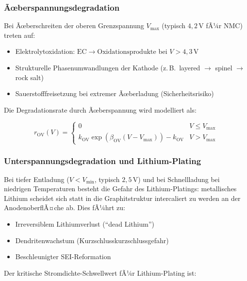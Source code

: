 ﻿\documentclass[12pt,a4paper]{article}
\begin{document}
	\subsubsection{Ãœberspannungsdegradation}
	
	Bei Ãœberschreiten der oberen Grenzspannung $V_\mathrm{max}$ (typisch
	$4{,}2\,\mathrm{V}$ fÃ¼r NMC) treten auf:
	
	\begin{itemize}
		\item Elektrolytoxidation: $\mathrm{EC} \rightarrow \text{Oxidationsprodukte}$ bei
		$V > 4{,}3\,\mathrm{V}$
		\item Strukturelle Phasenumwandlungen der Kathode (z.\,B.\ layered $\to$ spinel $\to$ rock salt)
		\item Sauerstofffreisetzung bei extremer Ãœberladung (Sicherheitsrisiko)
	\end{itemize}
	
	Die Degradationsrate durch Ãœberspannung wird modelliert als:
	
	\begin{equation}
		r_\mathrm{OV}(V) = \begin{cases}
			0 & V \leq V_\mathrm{max} \\
			k_\mathrm{OV} \exp\!\left(\beta_\mathrm{OV}(V - V_\mathrm{max})\right) - k_\mathrm{OV}
			& V > V_\mathrm{max}
		\end{cases}
		\label{eq:overvoltage_rate}
	\end{equation}
	
	\subsubsection{Unterspannungsdegradation und Lithium-Plating}
	
	Bei tiefer Entladung ($V < V_\mathrm{min}$, typisch $2{,}5\,\mathrm{V}$) und
	bei Schnellladung bei niedrigen Temperaturen besteht die Gefahr des Lithium-Platings:
	metallisches Lithium scheidet sich statt in die Graphitstruktur intercaliert zu werden
	an der AnodenoberflÃ¤che ab. Dies fÃ¼hrt zu:
	
	\begin{itemize}
		\item Irreversiblem Lithiumverlust (``dead Lithium'')
		\item Dendritenwachstum (Kurzschlusskurzschlussgefahr)
		\item Beschleunigter SEI-Reformation
	\end{itemize}
	
	Der kritische Stromdichte-Schwellwert fÃ¼r Lithium-Plating ist:
	
\end{document}
